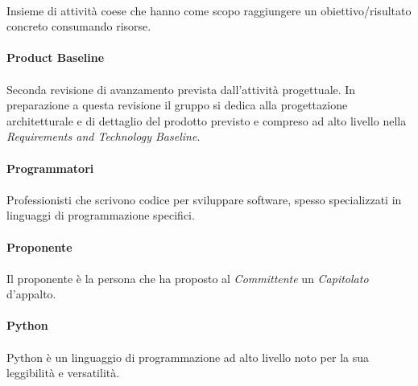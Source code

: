 \documentclass[10pt, a4paper]{article}
\begin{document}
\paragraph{}Insieme di attività coese che hanno come scopo raggiungere un obiettivo/risultato concreto consumando risorse.

\vspace{2em}
\paragraph{Product Baseline}\noindent\hrulefill
\paragraph{}Seconda revisione di avanzamento prevista dall’attività progettuale. In preparazione a questa revisione il gruppo si dedica alla progettazione architetturale e di dettaglio del prodotto previsto e compreso ad alto livello nella \textit{Requirements and Technology Baseline\pg}.

\vspace{2em}
\paragraph{Programmatori}\noindent\hrulefill
\paragraph{}Professionisti che scrivono codice per sviluppare software, spesso specializzati in linguaggi di programmazione specifici.




\vspace{2em}
\paragraph{Proponente}\noindent\hrulefill
\paragraph{}Il proponente è la persona che ha proposto al \textit{Committente\pg} un \textit{Capitolato\pg}
d’appalto.



\vspace{2em}
\paragraph{Python}\noindent\hrulefill
\paragraph{}Python è un linguaggio di programmazione ad alto livello noto per la sua leggibilità e versatilità.
\end{document}
